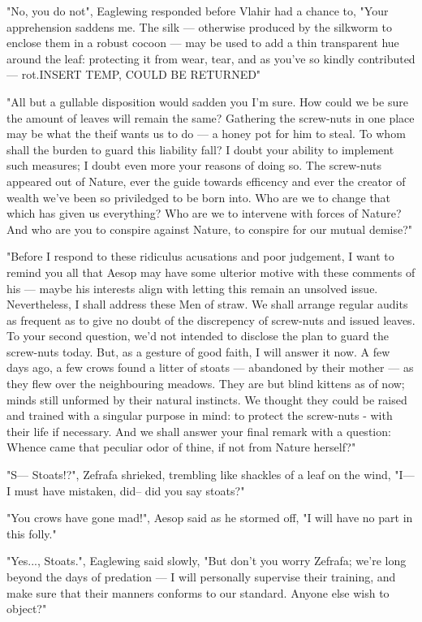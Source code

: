 "No, you do not", Eaglewing responded before Vlahir had a chance to, "Your apprehension saddens me. The silk — otherwise produced by the silkworm to enclose them in a robust cocoon — may be used to add a thin transparent hue around the leaf: protecting it from wear, tear, and as you've so kindly contributed — rot.INSERT TEMP, COULD BE RETURNED"

"All but a gullable disposition would sadden you I'm sure. How could we be sure the amount of leaves will remain the same? Gathering the screw-nuts in one place may be what the theif wants us to do — a honey pot for him to steal. To whom shall the burden to guard this liability fall? I doubt your ability to implement such measures; I doubt even more your reasons of doing so. The screw-nuts appeared out of Nature, ever the guide towards efficency and ever the creator of wealth we've been so priviledged to be born into. Who are we to change that which has given us everything? Who are we to intervene with forces of Nature? And who are you to conspire against Nature, to conspire for our mutual demise?"

"Before I respond to these ridiculus acusations and poor judgement, I want to remind you all that Aesop may have some ulterior motive with these comments of his — maybe his interests align with letting this remain an unsolved issue.
Nevertheless, I shall address these Men of straw.
We shall arrange regular audits as frequent as to give no doubt of the discrepency of screw-nuts and issued leaves.
To your second question, we'd not intended to disclose the plan to guard the screw-nuts today. But, as a gesture of good faith, I will answer it now. A few days ago, a few crows found a litter of stoats — abandoned by their mother — as they flew over the neighbouring meadows. They are but blind kittens as of now; minds still unformed by their natural instincts. We thought they could be raised and trained with a singular purpose in mind: to protect the screw-nuts - with their life if necessary.
And we shall answer your final remark with a question: Whence came that peculiar odor of thine, if not from Nature herself?"

"S— Stoats!?", Zefrafa shrieked, trembling like shackles of a leaf on the wind, "I— I must have mistaken, did– did you say stoats?"

"You crows have gone mad!", Aesop said as he stormed off, "I will have no part in this folly."

"Yes..., Stoats.", Eaglewing said slowly, "But don't you worry Zefrafa; we're long beyond the days of predation — I will personally supervise their training, and make sure that their manners conforms to our standard. Anyone else wish to object?"


